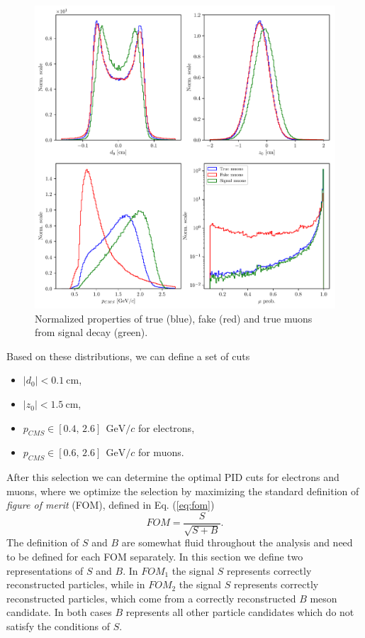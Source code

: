 \documentclass[headings=standardclasses,headings=big,oneside,a4paper,openany,12pt]{scrbook}
\newcommand {\e}[1]{\mathrm{~#1}}
\begin{document}
\begin{figure}[H]
\centering
\includegraphics[width=\linewidth]{fig/FSP_mu_vars}
\captionsetup{width=.8\linewidth}
\caption{Normalized properties of true (blue), fake (red) and true muons from signal decay (green).}
\label{fig:muvars}
\end{figure}

Based on these distributions, we can define a set of cuts
\begin{itemize}
\item $\vert d_0 \vert < 0.1\e{cm}$,
\item $\vert z_0 \vert < 1.5\e{cm}$,
\item $p_{CMS} \in [0.4,\,2.6]~\e{GeV}/c$ for electrons,
\item $p_{CMS} \in [0.6,\,2.6]~\e{GeV}/c$ for muons.
\end{itemize}


After this selection we can determine the optimal PID cuts for electrons and muons, where we optimize the selection by maximizing the standard definition of \textit{figure of merit} (FOM), defined in Eq. (\ref{eq:fom})
\begin{equation}
\label{eq:fom}
FOM = \frac{S}{\sqrt{S+B}}.
\end{equation} 
The definition of $S$ and $B$ are somewhat fluid throughout the analysis and need to be defined for each FOM separately. In this section we define two representations of $S$ and $B$. In $FOM_1$ the signal $S$ represents correctly reconstructed particles, while in $FOM_2$ the signal $S$ represents correctly reconstructed particles, which come from a correctly reconstructed $B$ meson candidate. In both cases $B$ represents all other particle candidates which do not satisfy the conditions of $S$.
\end{document}

